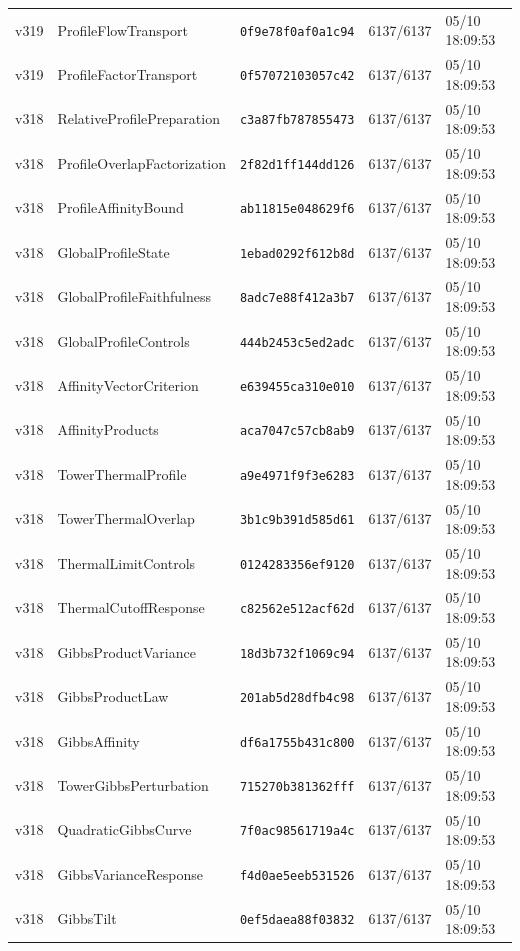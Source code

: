 \documentclass[11pt]{article}
\theoremstyle{definition}\newtheorem{deriv}{Derivation}
\begin{document}
{\begin{longtable}{@{}lllll@{}}
v319 & ProfileFlowTransport & \texttt{0f9e78f0af0a1c94} & 6137/6137 & 05/10 18:09:53 \\
v319 & ProfileFactorTransport & \texttt{0f57072103057c42} & 6137/6137 & 05/10 18:09:53 \\
v318 & RelativeProfilePreparation & \texttt{c3a87fb787855473} & 6137/6137 & 05/10 18:09:53 \\
v318 & ProfileOverlapFactorization & \texttt{2f82d1ff144dd126} & 6137/6137 & 05/10 18:09:53 \\
v318 & ProfileAffinityBound & \texttt{ab11815e048629f6} & 6137/6137 & 05/10 18:09:53 \\
v318 & GlobalProfileState & \texttt{1ebad0292f612b8d} & 6137/6137 & 05/10 18:09:53 \\
v318 & GlobalProfileFaithfulness & \texttt{8adc7e88f412a3b7} & 6137/6137 & 05/10 18:09:53 \\
v318 & GlobalProfileControls & \texttt{444b2453c5ed2adc} & 6137/6137 & 05/10 18:09:53 \\
v318 & AffinityVectorCriterion & \texttt{e639455ca310e010} & 6137/6137 & 05/10 18:09:53 \\
v318 & AffinityProducts & \texttt{aca7047c57cb8ab9} & 6137/6137 & 05/10 18:09:53 \\
v318 & TowerThermalProfile & \texttt{a9e4971f9f3e6283} & 6137/6137 & 05/10 18:09:53 \\
v318 & TowerThermalOverlap & \texttt{3b1c9b391d585d61} & 6137/6137 & 05/10 18:09:53 \\
v318 & ThermalLimitControls & \texttt{0124283356ef9120} & 6137/6137 & 05/10 18:09:53 \\
v318 & ThermalCutoffResponse & \texttt{c82562e512acf62d} & 6137/6137 & 05/10 18:09:53 \\
v318 & GibbsProductVariance & \texttt{18d3b732f1069c94} & 6137/6137 & 05/10 18:09:53 \\
v318 & GibbsProductLaw & \texttt{201ab5d28dfb4c98} & 6137/6137 & 05/10 18:09:53 \\
v318 & GibbsAffinity & \texttt{df6a1755b431c800} & 6137/6137 & 05/10 18:09:53 \\
v318 & TowerGibbsPerturbation & \texttt{715270b381362fff} & 6137/6137 & 05/10 18:09:53 \\
v318 & QuadraticGibbsCurve & \texttt{7f0ac98561719a4c} & 6137/6137 & 05/10 18:09:53 \\
v318 & GibbsVarianceResponse & \texttt{f4d0ae5eeb531526} & 6137/6137 & 05/10 18:09:53 \\
v318 & GibbsTilt & \texttt{0ef5daea88f03832} & 6137/6137 & 05/10 18:09:53 \\

\end{longtable}}
\end{document}
